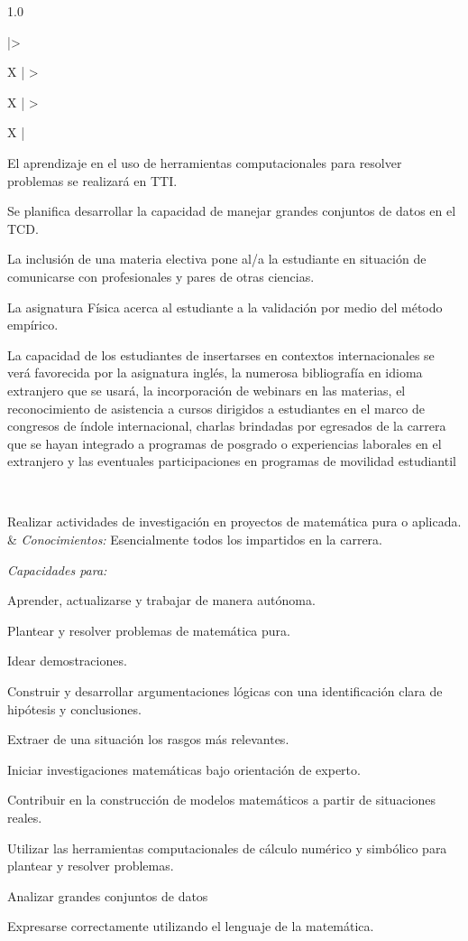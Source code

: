 \documentclass[a4paper, 12pt]{article}
\begin{document}
\begin{center}
\begin{xltabular}{1.0\textwidth}{|>{\raggedright\arraybackslash}X |
>{\raggedright\arraybackslash}X |
>{\raggedright\arraybackslash}X |
}
  El aprendizaje en el uso de herramientas computacionales para resolver problemas se realizará en  TTI.
  
  Se planifica desarrollar la capacidad de manejar grandes conjuntos de datos en el TCD.


 La inclusión de una materia electiva pone al/a la estudiante en situación de comunicarse con profesionales y pares de otras ciencias.
 

  La asignatura Física acerca  al estudiante a la validación por medio del método empírico.
  
 La capacidad de los estudiantes de insertarses en contextos internacionales se verá favorecida por la asignatura inglés, la numerosa bibliografía en idioma extranjero que se usará, la incorporación de webinars en las materias, el reconocimiento de asistencia a cursos dirigidos a estudiantes en el marco de congresos de índole internacional, charlas brindadas por egresados de la carrera que se hayan integrado a programas de posgrado o experiencias laborales en el extranjero    y las eventuales participaciones en programas de movilidad estudiantil  

 \\ \hline
     
  Realizar actividades de investigación en proyectos de matemática pura o aplicada.
  & 
  \emph{Conocimientos:}  Esencialmente todos los impartidos en la carrera.
  
  \emph{Capacidades para:}
  
   Aprender, actualizarse y trabajar de manera autónoma.
   
  Plantear y resolver problemas de matemática pura.
  
 Idear demostraciones.

  Construir y desarrollar argumentaciones lógicas con
una identificación clara de hipótesis y conclusiones.

Extraer de una situación los rasgos más
relevantes.

Iniciar investigaciones matemáticas bajo orientación
de experto.


 Contribuir en la construcción de modelos matemáticos a partir de situaciones reales.
 
Utilizar las herramientas computacionales de cálculo
numérico y simbólico para plantear y resolver problemas.

Analizar grandes conjuntos de datos

Expresarse correctamente utilizando el lenguaje de la matemática.


\end{xltabular}
\end{center}
\end{document}
